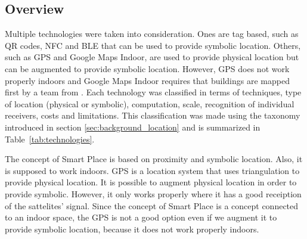 \subsection{Overview}
\label{sub:background_overview}
Multiple technologies were taken into consideration.
Ones are tag based, such as \gls{QR} codes, \gls{NFC} and \gls{BLE} that can be used to provide symbolic location.
Others, such as \gls{GPS} and Google Maps Indoor, are used to provide physical location but can be augmented to provide symbolic location.
However, \gls{GPS} does not work properly indoors and Google Maps Indoor requires that buildings are mapped first by a team from .
Each technology was classified in terms of techniques, type of location (physical or symbolic), computation, scale, recognition of individual receivers, costs and limitations.
This classification was made using the taxonomy introduced in section \ref{sec:background_location} and is summarized in Table~\ref{tab:technologies}.



The concept of Smart Place is based on proximity and symbolic location.
Also, it is supposed to work indoors.
\gls{GPS} is a location system that uses triangulation to provide physical location.
It is possible to augment physical location in order to provide symbolic.
However, it only works properly where it has a good receiption of the sattelites' signal.
Since the concept of Smart Place is a concept connected to an indoor space, the \gls{GPS} is not a good option even if we augment it to provide symbolic location, because it does not work properly indoors.

